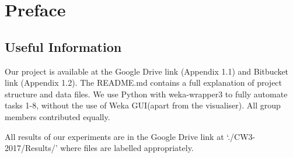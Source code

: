 \section{Preface}

\subsection{Useful Information} 
Our project is available at the Google Drive link (Appendix 1.1) and Bitbucket link (Appendix 1.2). The README.md contains a full explanation of project structure and data files. We use Python with weka-wrapper3 to fully automate tasks 1-8, without the use of Weka GUI(apart from the visualiser). All group members contributed equally.

All results of our experiments are in the Google Drive link at `./CW3-2017/Results/' where files are labelled appropriately. 